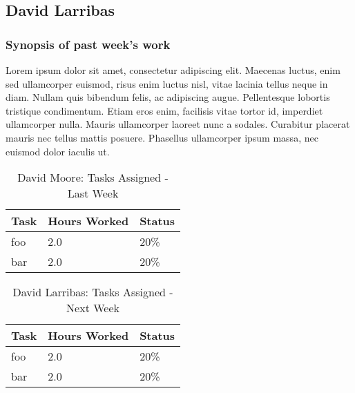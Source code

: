 \documentclass[12pt,journal,compsoc]{IEEEtran}
\begin{document}
\subsection{David Larribas}

\subsubsection*{Synopsis of past week's work}

Lorem ipsum dolor sit amet, consectetur adipiscing elit. Maecenas luctus, enim sed ullamcorper euismod, risus enim luctus nisl, vitae lacinia tellus neque in diam. Nullam quis bibendum felis, ac adipiscing augue. Pellentesque lobortis tristique condimentum. Etiam eros enim, facilisis vitae tortor id, imperdiet ullamcorper nulla. Mauris ullamcorper laoreet nunc a sodales. Curabitur placerat mauris nec tellus mattis posuere. Phasellus ullamcorper ipsum massa, nec euismod dolor iaculis ut.


\begin{table}[ht]
\renewcommand{\arraystretch}{1.3}
	\caption{David Moore: Tasks Assigned - Last Week}
	
	\label{Summary of David Larribas' activities: last week}
	
	\centering
	
	\begin{tabular}{p{5.5cm}|p{1cm}|p{1cm}}

	\hline
	\bfseries 	Task		 		& \bfseries Hours Worked	& \bfseries Status	\\
	\hline
	\hline
				foo					& 2.0						& 20\%				\\	%
				bar					& 2.0						& 20\%				\\	
	\hline
	\end{tabular}
\end{table}

\begin{table}[ht]
\renewcommand{\arraystretch}{1.3}
	\caption{David Larribas: Tasks Assigned - Next Week}
	
	\label{Summary of David Larribas' activites: this week}
	
	\centering
	
	\begin{tabular}{p{5.5cm}|p{1cm}|p{1cm}}

	\hline
	\bfseries 	Task		 		& \bfseries Hours Worked	& \bfseries Status	\\
	\hline
	\hline
				foo					& 2.0						& 20\%				\\	%
				bar					& 2.0						& 20\%				\\	
	\hline
	\end{tabular}
\end{table}
\end{document}
